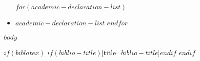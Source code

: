 \documentclass[
$if(fontsize)$
	$fontsize$,
$endif$
$if(lang)$
	$babel-lang$,
$endif$
$if(papersize)$
	$papersize$paper,
$endif$
$if(beamer)$
	ignorenonframetext,
$if(handout)$
	handout,
$endif$
$if(aspectratio)$
	aspectratio=$aspectratio$,
$endif$
$endif$
$for(classoption)$
	$classoption$$sep$,
$endfor$
]{$documentclass$}
\begin{document}
\begin{itemize}
$for(academic-declaration-list)$
	\item $academic-declaration-list$
$endfor$
\end{itemize}
\newpage

\hypersetup{pageanchor=true}
\pagestyle{fancy}
\fancyhf{}
\fancyhfoffset[L]{1cm} %
\fancyhfoffset[R]{1cm} %
\rfoot{}



$body$

\begin{appendix}
\end{appendix}


$if(biblatex)$
\printbibliography$if(biblio-title)$[title=$biblio-title$]$endif$
$endif$

\label{NumDocumentPages}
\end{document}
